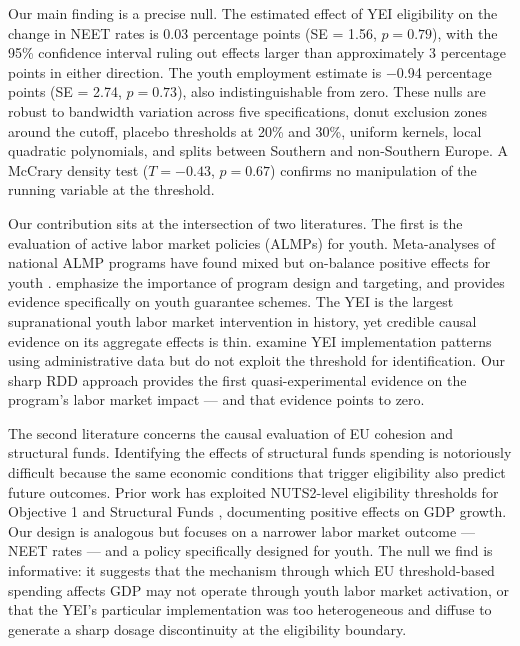 \documentclass[12pt]{article}
\begin{document}
Our main finding is a precise null. The estimated effect of YEI eligibility on the change in NEET rates is 0.03 percentage points (SE = 1.56, $p = 0.79$), with the 95\% confidence interval ruling out effects larger than approximately 3 percentage points in either direction. The youth employment estimate is $-$0.94 percentage points (SE = 2.74, $p = 0.73$), also indistinguishable from zero. These nulls are robust to bandwidth variation across five specifications, donut exclusion zones around the cutoff, placebo thresholds at 20\% and 30\%, uniform kernels, local quadratic polynomials, and splits between Southern and non-Southern Europe. A McCrary density test ($T = -0.43$, $p = 0.67$) confirms no manipulation of the running variable at the threshold.

Our contribution sits at the intersection of two literatures. The first is the evaluation of active labor market policies (ALMPs) for youth. Meta-analyses of national ALMP programs have found mixed but on-balance positive effects for youth \citep{kluve2010effectiveness, card2018works, heckman1999economics}. \citet{calmfors2002lessons} emphasize the importance of program design and targeting, and \citet{escudero2018active} provides evidence specifically on youth guarantee schemes. The YEI is the largest supranational youth labor market intervention in history, yet credible causal evidence on its aggregate effects is thin. \citet{ferrante2025youth} examine YEI implementation patterns using administrative data but do not exploit the threshold for identification. Our sharp RDD approach provides the first quasi-experimental evidence on the program's labor market impact --- and that evidence points to zero.

The second literature concerns the causal evaluation of EU cohesion and structural funds. Identifying the effects of structural funds spending is notoriously difficult because the same economic conditions that trigger eligibility also predict future outcomes. Prior work has exploited NUTS2-level eligibility thresholds for Objective 1 and Structural Funds \citep{becker2010going, pellegrini2013measuring}, documenting positive effects on GDP growth. Our design is analogous but focuses on a narrower labor market outcome --- NEET rates --- and a policy specifically designed for youth. The null we find is informative: it suggests that the mechanism through which EU threshold-based spending affects GDP may not operate through youth labor market activation, or that the YEI's particular implementation was too heterogeneous and diffuse to generate a sharp dosage discontinuity at the eligibility boundary.
\end{document}
